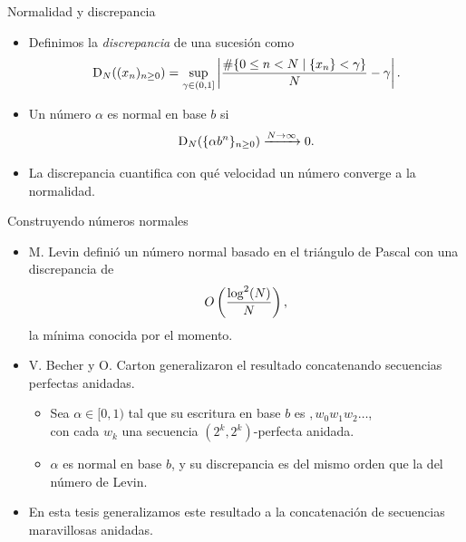 \documentclass[spanish,xcolor={table}]{beamer}
\begin{document}

\begin{frame}{Normalidad y discrepancia}

  \begin{itemize}
    \item Definimos la \emph{discrepancia} de una sucesión como
    \[
      \operatorname{D}_{N}((x_n)_{n \geq 0})
      = \sup_{\gamma \in (0,1]} \left\vert
        \frac{\# \lbrace 0 \leq n < N \;\vert\; \lbrace x_n \rbrace < \gamma \rbrace}
        {N} - \gamma
      \right\vert.
    \]
    \item Un número $\alpha$ es normal en base $b$ si
    \[ \operatorname{D}_{N}(\lbrace \alpha b^n \rbrace_{n\geq0})
    \xrightarrow{N \to \infty} 0. \]
    \item La discrepancia cuantifica con qué velocidad un número converge a
    la normalidad.
  \end{itemize}

\end{frame}


\begin{frame}{Construyendo números normales}
  \begin{itemize}
    \item M. Levin definió un número normal basado en el triángulo de Pascal
    con una discrepancia de
    \[ O \left(\frac{\log^2(N)}{N}\right), \]
    la mínima conocida por el momento.
    \item V. Becher y O. Carton generalizaron el resultado concatenando
    secuencias perfectas anidadas.
    \begin{itemize}
      \item Sea $\alpha \in [0, 1)$ tal que su escritura en base $b$ es ${,}w_0 w_1 w_2 \dots$, \\ con cada $w_k$ una secuencia $(2^k,2^k)$-perfecta anidada.
      \item $\alpha$ es normal en base $b$,
      y su discrepancia es del mismo orden que la del número de Levin.
    \end{itemize}
    \item En esta tesis generalizamos este resultado a la concatenación
    de secuencias maravillosas anidadas.
  \end{itemize}
\end{frame}

\end{document}
